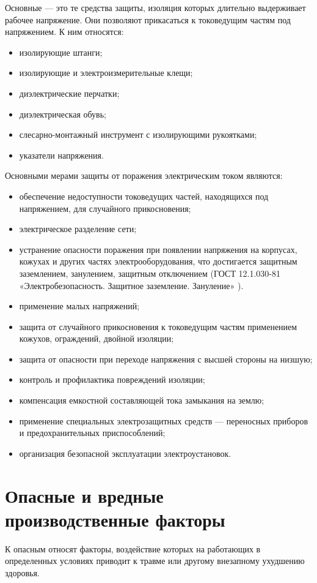 Основные — это те средства защиты, изоляция которых длительно выдерживает рабочее напряжение. Они позволяют прикасаться к токоведущим частям под напряжением. К ним относятся:
\begin{itemize}
	\item изолирующие штанги;
	\item изолирующие и электроизмерительные клещи;
	\item диэлектрические перчатки;
	\item диэлектрическая обувь;
	\item слесарно-монтажный инструмент с изолирующими рукоятками;
	\item указатели напряжения.
\end{itemize}
Основными мерами защиты от поражения электрическим током являются:
\begin{itemize}
	\item обеспечение недоступности токоведущих частей, находящихся под напряжением, для случайного прикосновения;
	\item электрическое разделение сети;
	\item устранение опасности поражения при появлении напряжения на корпусах, кожухах и других частях электрооборудования, что достигается защитным заземлением, занулением, защитным отключением (ГОСТ 12.1.030-81 «Электробезопасность. Защитное заземление. Зануление» ).
	\item применение малых напряжений;
	\item защита от случайного прикосновения к токоведущим частям применением кожухов, ограждений, двойной изоляции;
	\item защита от опасности при переходе напряжения с высшей стороны на низшую;
	\item контроль и профилактика повреждений изоляции;
	\item компенсация емкостной составляющей тока замыкания на землю;
	\item применение специальных электрозащитных средств — переносных приборов и предохранительных приспособлений;
	\item организация безопасной эксплуатации электроустановок.
\end{itemize}

\section{Опасные и вредные производственные факторы}
К опасным относят факторы, воздействие которых на работающих в определенных условиях приводит к травме или другому внезапному ухудшению здоровья. 

